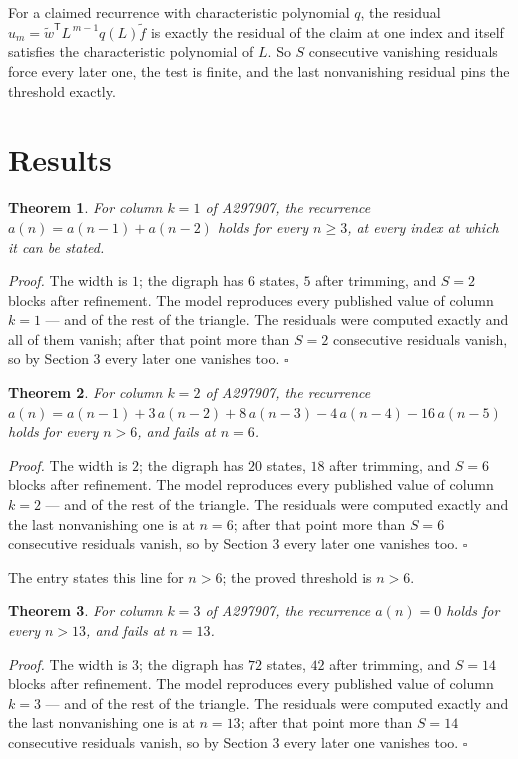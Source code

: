 \documentclass[11pt]{article}
\newtheorem{theorem}{Theorem}
\theoremstyle{definition}
\begin{document}
For a claimed recurrence with characteristic polynomial $q$, the residual $u_m = \tilde w^{\mathsf T}L^{\,m-1}q(L)\tilde f$ is exactly the residual of the claim at one index and itself satisfies the characteristic polynomial of $L$. So $S$ consecutive vanishing residuals force every later one, the test is finite, and the last nonvanishing residual pins the threshold exactly.

\section{Results}

\begin{theorem} For column $k = 1$ of A297907, the recurrence $a(n) = a(n-1) + a(n-2)$ holds for every $n \ge 3$, at every index at which it can be stated.\end{theorem}

{\itshape Proof.} The width is $1$; the digraph has $6$ states, $5$ after trimming, and $S = 2$ blocks after refinement. The model reproduces every published value of column $k = 1$ --- and of the rest of the triangle. The residuals were computed exactly and all of them vanish; after that point more than $S = 2$ consecutive residuals vanish, so by Section 3 every later one vanishes too. $\square$

\begin{theorem} For column $k = 2$ of A297907, the recurrence $a(n) = a(n-1) + 3\,a(n-2) + 8\,a(n-3) - 4\,a(n-4) - 16\,a(n-5)$ holds for every $n > 6$, and fails at $n = 6$.\end{theorem}

{\itshape Proof.} The width is $2$; the digraph has $20$ states, $18$ after trimming, and $S = 6$ blocks after refinement. The model reproduces every published value of column $k = 2$ --- and of the rest of the triangle. The residuals were computed exactly and the last nonvanishing one is at $n = 6$; after that point more than $S = 6$ consecutive residuals vanish, so by Section 3 every later one vanishes too. $\square$

The entry states this line for $n > 6$; the proved threshold is $n > 6$.

\begin{theorem} For column $k = 3$ of A297907, the recurrence $a(n) = 0$ holds for every $n > 13$, and fails at $n = 13$.\end{theorem}

{\itshape Proof.} The width is $3$; the digraph has $72$ states, $42$ after trimming, and $S = 14$ blocks after refinement. The model reproduces every published value of column $k = 3$ --- and of the rest of the triangle. The residuals were computed exactly and the last nonvanishing one is at $n = 13$; after that point more than $S = 14$ consecutive residuals vanish, so by Section 3 every later one vanishes too. $\square$
\end{document}
